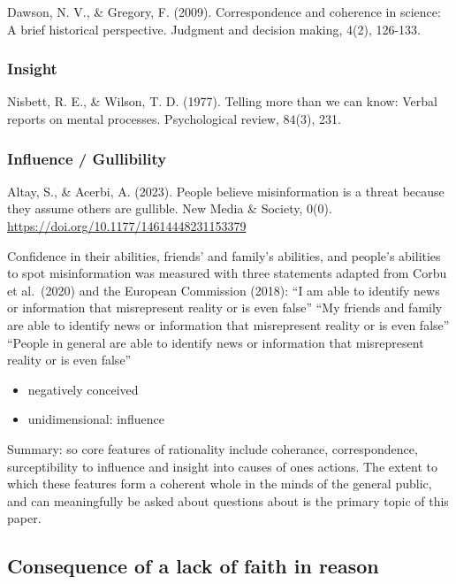 \documentclass[
  ,jou,floatsintext]{apa6}
\providecommand{\tightlist}{%
  \setlength{\itemsep}{0pt}\setlength{\parskip}{0pt}}
\begin{document}
Dawson, N. V., \& Gregory, F. (2009). Correspondence and coherence in science: A brief historical perspective. Judgment and decision making, 4(2), 126-133.

\hypertarget{insight}{%
\subsubsection{Insight}\label{insight}}

Nisbett, R. E., \& Wilson, T. D. (1977). Telling more than we can know: Verbal reports on mental processes. Psychological review, 84(3), 231.

\hypertarget{influence-gullibility}{%
\subsubsection{Influence / Gullibility}\label{influence-gullibility}}

Altay, S., \& Acerbi, A. (2023). People believe misinformation is a threat because they assume others are gullible. New Media \& Society, 0(0). \url{https://doi.org/10.1177/14614448231153379}

Confidence in their abilities, friends' and family's abilities, and people's abilities to spot misinformation was measured with three statements adapted from Corbu et al.~(2020) and the European Commission (2018):
``I am able to identify news or information that misrepresent reality or is even false''
``My friends and family are able to identify news or information that misrepresent reality or is even false''
``People in general are able to identify news or information that misrepresent reality or is even false''

\begin{itemize}
\tightlist
\item
  negatively conceived
\item
  unidimensional: influence
\end{itemize}

Summary: so core features of rationality include coherance, correspondence, surceptibility to influence and insight into causes of ones actions. The extent to which these features form a coherent whole in the minds of the general public, and can meaningfully be asked about questions about is the primary topic of this paper.

\hypertarget{consequence-of-a-lack-of-faith-in-reason}{%
\subsection{Consequence of a lack of faith in reason}\label{consequence-of-a-lack-of-faith-in-reason}}
\end{document}
